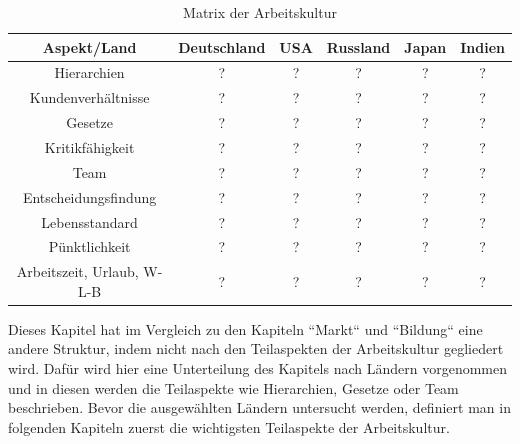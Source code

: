 \begin{table}[htp]
\begin{tabular}{|c|c|c|c|c|c|}
\hline  Aspekt/Land& Deutschland & USA & Russland & Japan & Indien \\ 
\hline 	Hierarchien  & ? & ? & ? & ? & ? \\ 
\hline  Kundenverhältnisse& ? & ? & ? & ? & ? \\ 
\hline  Gesetze& ? & ? & ? & ? & ?  \\ 
\hline  Kritikfähigkeit& ? & ? & ? & ? & ? \\ 
\hline  Team& ? & ? & ? & ? & ?\\ 
\hline  Entscheidungsfindung& ? & ? & ? & ? & ?  \\ 
\hline  Lebensstandard& ? & ? & ? & ? & ? \\ 
\hline  Pünktlichkeit& ? & ? & ? & ? & ?\\ 
\hline  Arbeitszeit, Urlaub, W-L-B& ? & ? & ? & ? & ?\\ 
\hline 
\end{tabular} 
\caption{Matrix der Arbeitskultur}
\end{table}
%
Dieses Kapitel hat im Vergleich zu den Kapiteln ``Markt`` und ``Bildung`` eine andere Struktur, indem nicht nach den Teilaspekten der Arbeitskultur gegliedert wird. Dafür wird hier eine Unterteilung des Kapitels nach Ländern vorgenommen und in diesen werden die Teilaspekte wie Hierarchien, Gesetze oder Team beschrieben.
Bevor die ausgewählten Ländern untersucht werden, definiert man in folgenden Kapiteln zuerst die wichtigsten Teilaspekte der Arbeitskultur.


